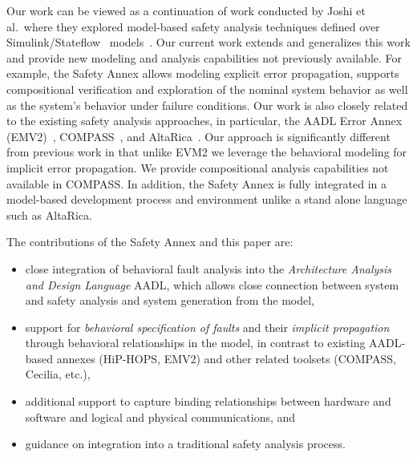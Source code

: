 Our work can be viewed as a continuation of work conducted by Joshi et al.~where they explored model-based safety analysis techniques defined over Simulink/Stateflow~\cite{MathWorks} models~\cite{Joshi05:SafeComp,Joshi07:Hase,Joshi05:Dasc,DBLP:conf/cav/BozzanoCPJKPRT15}. Our current work extends and generalizes this work and provide new modeling and analysis capabilities not previously available.  For example, the Safety Annex allows modeling explicit %
error propagation, supports compositional verification and exploration of the nominal system behavior as well as the system's behavior under failure conditions. Our work is also closely related to the existing safety analysis approaches, in particular, the AADL Error Annex (EMV2)~\cite{EMV2}, COMPASS~\cite{10.1007/978-3-642-04468-7_15}, and AltaRica~\cite{PROSVIRNOVA2013127,BieberERTS2018}. Our approach is significantly different from previous work in that unlike EVM2 we leverage the behavioral modeling for implicit %
error propagation.  We provide compositional analysis capabilities not available in COMPASS.  In addition, the Safety Annex  is fully integrated in a model-based development process and environment unlike a stand alone language such as AltaRica. 

The contributions of the Safety Annex and this paper are:
\begin{itemize}
\renewcommand{\labelitemi}{\textbullet}
		\item close integration of behavioral fault analysis into the {\em Architecture Analysis and Design Language} AADL, which allows close connection between system and safety analysis and system generation from the model,
		\item support for {\em behavioral specification of faults} and their {\em implicit propagation} through behavioral relationships in the model, in contrast to existing AADL-based annexes (HiP-HOPS, EMV2) and other related toolsets (COMPASS, Cecilia, etc.),
		\item additional support to capture binding relationships between hardware and software and logical and physical communications, and
		\item guidance on integration into a traditional safety analysis process.
\end{itemize}


